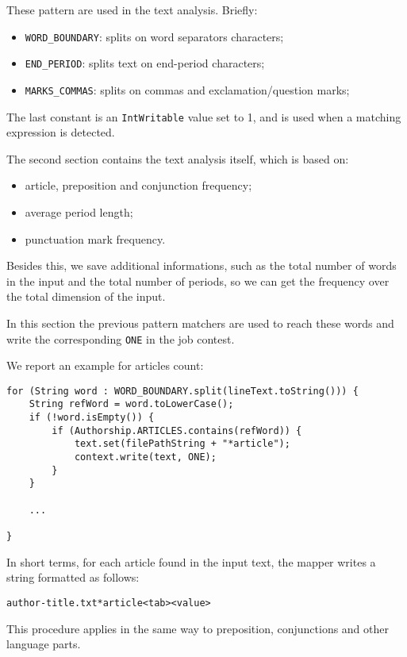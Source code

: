 \documentclass[a4paper,11pt, twoside]{article}
\begin{document}
	These pattern are used in the text analysis. Briefly: \begin{itemize}
		\item \lstinline|WORD_BOUNDARY|: splits on word separators characters;
		\item \lstinline|END_PERIOD|: splits text on end-period characters;
		\item \lstinline|MARKS_COMMAS|: splits on commas and exclamation/question marks;
	\end{itemize}

	The last constant is an \lstinline|IntWritable| value set to 1, and is used when a matching expression is detected.

	The second section contains the text analysis itself, which is based on: \begin{itemize}
		\item article, preposition and conjunction frequency;
		\item average period length;
		\item punctuation mark frequency.
	\end{itemize}
	Besides this, we save additional informations, such as the total number of words in the input and the total number of periods, so we can get the frequency over the total dimension of the input.

	In this section the previous pattern matchers are used to reach these words and write the corresponding \lstinline|ONE| in the job contest. 
	
	We report an example for articles count: \begin{lstlisting}[firstnumber=85, caption={Articles counting in Map method}, captionpos=b]
for (String word : WORD_BOUNDARY.split(lineText.toString())) {
	String refWord = word.toLowerCase();
	if (!word.isEmpty()) {
		if (Authorship.ARTICLES.contains(refWord)) {
			text.set(filePathString + "*article");
			context.write(text, ONE);
		}
	}

	...

}
	\end{lstlisting}
	
	In short terms, for each article found in the input text, the mapper writes a string formatted as follows:\begin{center}
		\texttt{author-title.txt*article\textless tab\textgreater \textless value\textgreater} 
	\end{center}

	This procedure applies in the same way to preposition, conjunctions and other language parts.
	
\end{document}

